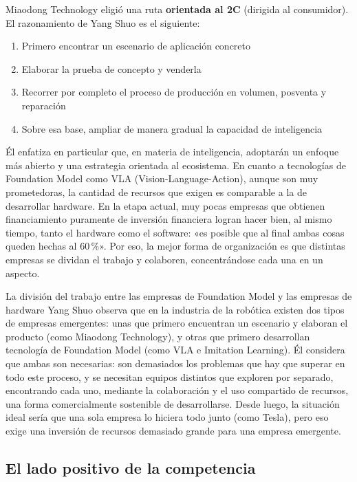 \documentclass[a4paper]{article}
\begin{document}
Miaodong Technology eligió una ruta \textbf{orientada al 2C} (dirigida al consumidor). El razonamiento de Yang Shuo es el siguiente:

\begin{enumerate}
    \item Primero encontrar un escenario de aplicación concreto
    \item Elaborar la prueba de concepto y venderla
    \item Recorrer por completo el proceso de producción en volumen, posventa y reparación
    \item Sobre esa base, ampliar de manera gradual la capacidad de inteligencia
\end{enumerate}

Él enfatiza en particular que, en materia de inteligencia, adoptarán un enfoque más abierto y una estrategia orientada al ecosistema. En cuanto a tecnologías de Foundation Model como VLA (Vision-Language-Action), aunque son muy prometedoras, la cantidad de recursos que exigen es comparable a la de desarrollar hardware. En la etapa actual, muy pocas empresas que obtienen financiamiento puramente de inversión financiera logran hacer bien, al mismo tiempo, tanto el hardware como el software: «es posible que al final ambas cosas queden hechas al 60\,\%». Por eso, la mejor forma de organización es que distintas empresas se dividan el trabajo y colaboren, concentrándose cada una en un aspecto.

\begin{knowledgebox}{La división del trabajo entre las empresas de Foundation Model y las empresas de hardware}
Yang Shuo observa que en la industria de la robótica existen dos tipos de empresas emergentes: unas que primero encuentran un escenario y elaboran el producto (como Miaodong Technology), y otras que primero desarrollan tecnología de Foundation Model (como VLA e Imitation Learning). Él considera que ambas son necesarias: son demasiados los problemas que hay que superar en todo este proceso, y se necesitan equipos distintos que exploren por separado, encontrando cada uno, mediante la colaboración y el uso compartido de recursos, una forma comercialmente sostenible de desarrollarse. Desde luego, la situación ideal sería que una sola empresa lo hiciera todo junto (como Tesla), pero eso exige una inversión de recursos demasiado grande para una empresa emergente.
\end{knowledgebox}

\subsection{El lado positivo de la competencia}
\end{document}
